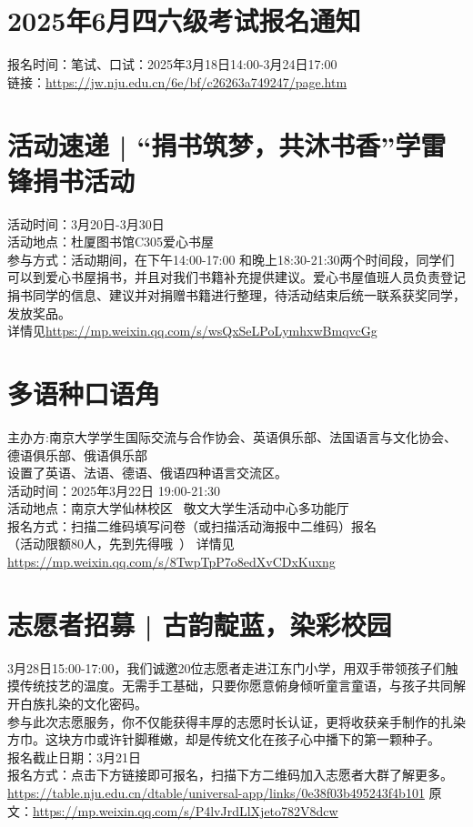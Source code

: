 \documentclass[letterpaper, 12pt]{article}
\begin{document}
\begin{multicols}{2}
\section{2025年6月四六级考试报名通知}
报名时间：笔试、口试：2025年3月18日14:00-3月24日17:00\\
链接：\url{https://jw.nju.edu.cn/6e/bf/c26263a749247/page.htm}\\
\section{活动速递 | “捐书筑梦，共沐书香”学雷锋捐书活动}
活动时间：3月20日-3月30日\\
活动地点：杜厦图书馆C305爱心书屋\\
参与方式：活动期间，在下午14:00-17:00 和晚上18:30-21:30两个时间段，同学们可以到爱心书屋捐书，并且对我们书籍补充提供建议。爱心书屋值班人员负责登记捐书同学的信息、建议并对捐赠书籍进行整理，待活动结束后统一联系获奖同学，发放奖品。\\
详情见\url{https://mp.weixin.qq.com/s/wsQxSeLPoLymhxwBmqvcGg}\\

\section{多语种口语角}

主办方:南京大学学生国际交流与合作协会、英语俱乐部、法国语言与文化协会、德语俱乐部、俄语俱乐部\\
设置了英语、法语、德语、俄语四种语言交流区。\\
活动时间：2025年3月22日 19:00-21:30\\
活动地点：南京大学仙林校区  敬文大学生活动中心多功能厅\\
报名方式：扫描二维码填写问卷（或扫描活动海报中二维码）报名\\
（活动限额80人，先到先得哦~）
详情见\url{https://mp.weixin.qq.com/s/8TwpTpP7o8edXvCDxKuxng}\\

\section{志愿者招募 | 古韵靛蓝，染彩校园}
3月28日15:00-17:00，我们诚邀20位志愿者走进江东门小学，用双手带领孩子们触摸传统技艺的温度。无需手工基础，只要你愿意俯身倾听童言童语，与孩子共同解开白族扎染的文化密码。\\
参与此次志愿服务，你不仅能获得丰厚的志愿时长认证，更将收获亲手制作的扎染方巾。这块方巾或许针脚稚嫩，却是传统文化在孩子心中播下的第一颗种子。\\
报名截止日期：3月21日\\
报名方式：点击下方链接即可报名，扫描下方二维码加入志愿者大群了解更多。\\
\url{https://table.nju.edu.cn/dtable/universal-app/links/0e38f03b495243f4b101}
原文：\url{https://mp.weixin.qq.com/s/P4lvJrdLlXjeto782V8dcw}


\end{multicols}
\end{document}
